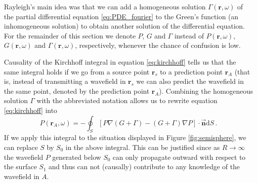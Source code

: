 Rayleigh's main idea was that we can add a homogeneous solution $\Gamma(\mathbf r, \omega)$ of the partial differential equation \ref{eq:PDE_fourier} to the Green's function (an inhomogeneous solution) to obtain another solution of the differential equation. For the remainder of this section we denote $P$, $G$ and $\Gamma$ instead of $P(\mathbf r, \omega)$, $G(\mathbf r, \omega)$ and $\Gamma(\mathbf r, \omega)$, respectively, whenever the chance of confusion is low.

Causality of the Kirchhoff integral in equation \ref{eq:kirchhoff} tells us that the same integral holds if we go from a source point $\mathbf r_s$ to a prediction point $\mathbf r_A$ \cite[Section 4.3]{Book_Eric} (that is, instead of transmitting a wavefield in $\mathbf r_s$ we can also predict the wavefield in the same point, denoted by the prediction point $\mathbf r_A$). Combining the homogeneous solution $\Gamma$ with the abbreviated notation allows us to rewrite equation \ref{eq:kirchhoff} into
\begin{equation}
    P(\mathbf r_A, \omega) = - \oint_S [P \nabla (G + \Gamma) - (G + \Gamma) \nabla P] \cdot \overrightarrow{\mathbf n} \mathrm dS \,. \nonumber
\end{equation}
If we apply this integral to the situation displayed in Figure \ref{fig:semisphere}, we can replace $S$ by $S_0$ in the above integral.
This can be justified since as $R\to \infty$ the wavefield $P$ generated below $S_0$ can only propagate outward with respect to the surface $S_1$ and thus can not (causally) contribute to any knowledge of the wavefield in $A$.

